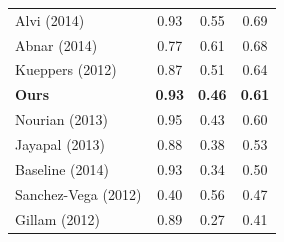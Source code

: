 \begin{table}[th]
\begin{tabular}{@{}l*{3}{c}}
Alvi (2014)          &      0.93 &   0.55 &  0.69 \\
Abnar (2014)         &      0.77 &   0.61 &  0.68 \\
Kueppers (2012)      &      0.87 &   0.51 &  0.64 \\
\textbf{Ours}        &\textbf{0.93} &   \textbf{0.46} &  \textbf{0.61} \\
Nourian (2013)       &      0.95 &   0.43 &  0.60 \\
Jayapal (2013)       &      0.88 &   0.38 &  0.53 \\
Baseline (2014)      &      0.93 &   0.34 &  0.50 \\
Sanchez-Vega (2012)  &      0.40 &   0.56 &  0.47 \\
Gillam (2012)        &      0.89 &   0.27 &  0.41 \\
\bottomrule
\end{tabular}

\end{table}

